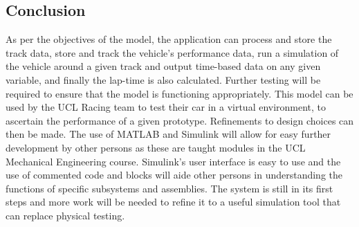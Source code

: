 \documentclass[11pt]{article}
\numberwithin{equation}{section}
\begin{document}
\subsection{Conclusion}
As per the objectives of the model, the application can process and store the track data, store and track the vehicle's performance data, run a simulation of the vehicle around a given track and output time-based data on any given variable, and finally the lap-time is also calculated. Further testing will be required to ensure that the model is functioning appropriately. This model can be used by the UCL Racing team to test their car in a virtual environment, to ascertain the performance of a given prototype. Refinements to design choices can then be made. The use of MATLAB and Simulink will allow for easy further development by other persons as these are taught modules in the UCL Mechanical Engineering course. Simulink's user interface is easy to use and the use of commented code and blocks will aide other persons in understanding the functions of specific subsystems and assemblies. The system is still in its first steps and more work will be needed to refine it to a useful simulation tool that can replace physical testing.
\newpage


\end{document}
